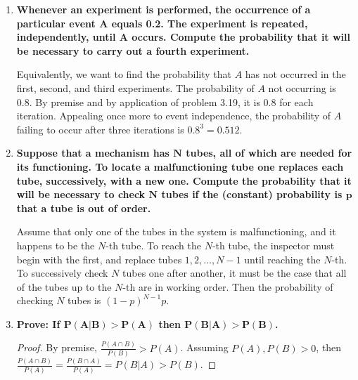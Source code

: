 \documentclass[10pt, oneside]{article}   	%
\theoremstyle{definition}
\begin{document}
\begin{enumerate}[label=3.\arabic*]
\item  \begin{tcolorbox}[
  colback=Cerulean!5!white,
  colframe=Cerulean!75!black]
\textbf{Whenever an experiment is performed, the occurrence of a particular event $\bm{A}$ equals 0.2. The experiment is repeated, independently, until $\bm{A}$ occurs. Compute the probability that it will be necessary to carry out a fourth experiment.}
\end{tcolorbox}

Equivalently, we want to find the probability that $A$ has not occurred in the first, second, and third experiments. The probability of $A$ not occurring is 0.8. By premise and by application of problem 3.19, it is 0.8 for each iteration. Appealing once more to event independence, the probability of $A$ failing to occur after three iterations is $0.8^3 = \boxed{0.512}$.

\item  \begin{tcolorbox}[
  colback=Cerulean!5!white,
  colframe=Cerulean!75!black]
\textbf{Suppose that a mechanism has $\bm{N}$ tubes, all of which are needed for its functioning. To locate a malfunctioning tube one replaces each tube, successively, with a new one. Compute the probability that it will be necessary to check $\bm{N}$ tubes if the (constant) probability is $\bm{p}$ that a tube is out of order.}
\end{tcolorbox}

Assume that only one of the tubes in the system is malfunctioning, and it happens to be the $N$-th tube. To reach the $N$-th tube, the inspector must begin with the first, and replace tubes $1, 2, ..., N-1$ until reaching the $N$-th. To successively check $N$ tubes one after another, it must be the case that all of the tubes up to the $N$-th are in working order. Then the probability of checking $N$ tubes is $\boxed{(1-p)^{N-1} p}$.

\item  \begin{tcolorbox}[
  colback=Cerulean!5!white,
  colframe=Cerulean!75!black]
\textbf{Prove: If $\bm{P(A | B) > P(A)}$ then $\bm{P(B | A) > P(B)}$.}
\end{tcolorbox}

\begin{proof}
By premise, $\frac{P(A \cap B)}{P(B)} > P(A)$. Assuming $P(A), P(B) > 0$, then $\frac{P(A \cap B)}{P(A)}  = \frac{P(B \cap A)}{P(A)} = P(B | A) > P(B)$. 
\end{proof}


\end{enumerate}
\end{document}
